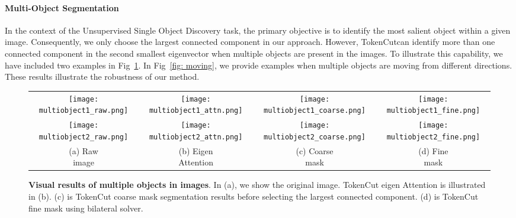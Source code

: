 \documentclass[twocolumn]{article}
\newcommand{\name} {TokenCut}
\begin{document}
\paragraph*{Multi-Object Segmentation}
In the context of the Unsupervised Single Object Discovery task, the primary objective is to identify the most salient object within a given image. Consequently, we only choose the largest connected component in our approach. However,  \name  can identify more than one connected component in the second smallest eigenvector when multiple objects are present in the images. To illustrate this capability, we have included two examples in Fig~\ref{fig: multiobject}. In Fig~\ref{fig: moving}, we provide examples when multiple objects are moving from different directions. These results illustrate the robustness of our method.

\begin{figure}[!ht]
    \centering
    \begin{tabular}{c@{\hskip 3pt}c@{\hskip 3pt}c@{\hskip 3pt}c}
        \texttt{[image: multiobject1\_raw.png]} &
        \texttt{[image: multiobject1\_attn.png]} &
        \texttt{[image: multiobject1\_coarse.png]} &
        \texttt{[image: multiobject1\_fine.png]} \\ 
        
        \texttt{[image: multiobject2\_raw.png]} &
         \texttt{[image: multiobject2\_attn.png]} &
          \texttt{[image: multiobject2\_coarse.png]} &
        \texttt{[image: multiobject2\_fine.png]} \\
        \makecell{(a) Raw \\ image} & \makecell{(b) Eigen \\ Attention} & \makecell{(c) Coarse \\ mask} & \makecell{(d) Fine \\ mask} \\
    \end{tabular}
    \caption{\textbf{Visual results of multiple objects in images}. In (a), we show the original image. TokenCut eigen Attention is illustrated in (b). (c) is TokenCut coarse mask segmentation results before selecting the largest connected component. (d) is TokenCut fine mask using bilateral solver.} 
    \label{fig: multiobject}
\end{figure}
\end{document}
